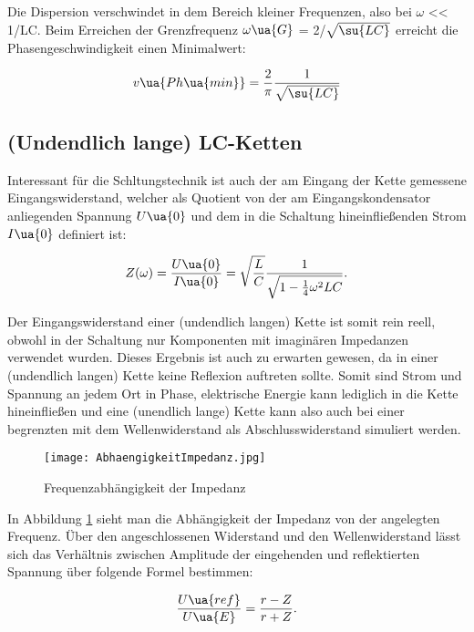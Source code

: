 Die Dispersion verschwindet in dem Bereich kleiner Frequenzen, also bei $\omega$
<< 1/LC. Beim Erreichen der Grenzfrequenz $\omega\ua{G}$ = 2/$\sqrt{\su{LC}}$ erreicht
die Phasengeschwindigkeit einen Minimalwert:

\begin{equation}
  v\ua{Ph\ua{min}} =  \frac{2}{\pi} \frac{1}{\sqrt{\su{LC}}}
  \label{eqn:Phasengeschwindigkeit}
\end{equation}

\subsection{(Undendlich lange) LC-Ketten}

Interessant für die Schltungstechnik ist auch der am Eingang der Kette gemessene
Eingangswiderstand, welcher als Quotient von der am Eingangskondensator anliegenden
Spannung $U\ua{0}$ und dem in die Schaltung hineinfließenden Strom $I\ua{0}$
definiert ist:

\begin{equation}
  Z(\omega) = \frac{U\ua{0}}{I\ua{0}} = \sqrt{ \frac{L}{C}} \frac{1}{ \sqrt{1 - \frac{1}{4} \omega^2 LC} }.
\end{equation}

Der Eingangswiderstand einer (undendlich langen) Kette ist somit rein reell,
obwohl in der Schaltung nur Komponenten mit imaginären Impedanzen verwendet wurden.
Dieses Ergebnis ist auch zu erwarten gewesen, da in einer (undendlich langen) Kette
keine Reflexion auftreten sollte. Somit sind Strom und Spannung an jedem Ort in
Phase, elektrische Energie kann lediglich in die Kette hineinfließen und eine
(unendlich lange) Kette kann also auch bei einer begrenzten mit dem Wellenwiderstand
als Abschlusswiderstand simuliert werden.

\begin{figure}
  \texttt{[image: AbhaengigkeitImpedanz.jpg]}
  \caption{Frequenzabhängigkeit der Impedanz \cite{anleitung01}}
  \label{fig:Impedanzabhängigkeit}
\end{figure}

In Abbildung \ref{fig:Impedanzabhängigkeit} sieht man die Abhängigkeit der Impedanz
von der angelegten Frequenz.
Über den angeschlossenen Widerstand und den Wellenwiderstand lässt sich das
Verhältnis zwischen Amplitude der eingehenden und reflektierten Spannung über folgende
Formel bestimmen:

\begin{equation}
  \frac{U\ua{ref}}{U\ua{E}} = \frac{r - Z}{r + Z}.
\end{equation}


